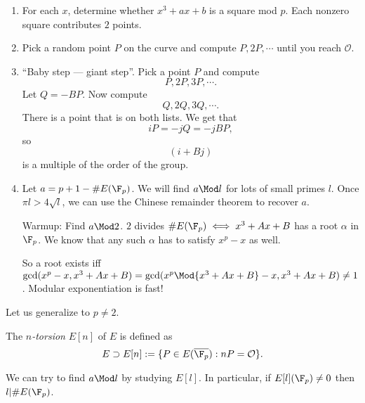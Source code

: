 \documentclass{article}
\begin{document}
\begin{enumerate}
\item For each $x$, determine whether $x^3+ax+b$ is a square mod $p$. Each
  nonzero square contributes $2$ points.
\item Pick a random point $P$ on the curve and compute $P,2P,\cdots$ until you
  reach $\mathcal O$.
\item ``Baby step --- giant step''. Pick a point $P$ and compute
  $$P,2P,3P,\cdots.$$
  Let $Q=-BP$. Now compute
  $$Q,2Q,3Q,\cdots.$$
  There is a point that is on both lists. We get that
  $$iP = -jQ = -jBP,$$
  so $$(i+Bj)$$ is a multiple of the order of the group.
\item Let $a=p+1-\#E(\F_p)$.
  We will find $a\Mod l$ for lots of small primes $l$. Once $\pi l>4\sqrt l$, we
  can use the Chinese remainder theorem to recover $a$.

  Warmup: Find $a\Mod 2$.
  $2$ divides $\#E(\F_p)\iff x^3+Ax+B$ has a root $\alpha$ in $\F_p$. We know
  that any such $\alpha$ has to satisfy $x^p-x$ as well.

  So a root exists iff $\gcd(x^p-x, x^3+Ax+B) = \gcd(x^p\Mod {x^3+Ax+B} - x,
  x^3+Ax+B) \neq 1$. Modular exponentiation is fast!
\end{enumerate}

Let us generalize to $p\neq 2$.
\begin{defn}
  The \textit{$n$-torsion} $E[n]$ of $E$ is defined as
  $$E\supset E[n] := \{P\in E(\overline{\F_p}):nP = \mathcal O\}.$$
\end{defn}

We can try to find $a\Mod l$ by studying $E[l]$. In particular, if $E[l](\F_p)
\neq 0$ then $l|\#E(\F_p)$.
\end{document}
